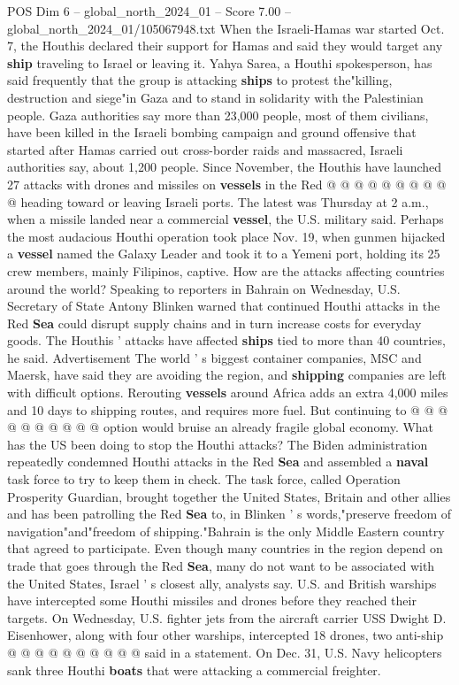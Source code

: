 \begin{textsample}{POS Dim 6 – global\_north\_2024\_01 – Score 7.00 – global\_north\_2024\_01/105067948.txt}
When the Israeli-Hamas war started Oct. 7, the Houthis declared their support for Hamas and said they would target any \textbf{ship} traveling to Israel or leaving it.
Yahya Sarea, a Houthi spokesperson, has said frequently that the group is attacking \textbf{ships} to protest the"killing, destruction and siege"in Gaza and to stand in solidarity with the Palestinian people.
Gaza authorities say more than 23,000 people, most of them civilians, have been killed in the Israeli bombing campaign and ground offensive that started after Hamas carried out cross-border raids and massacred, Israeli authorities say, about 1,200 people.
Since November, the Houthis have launched 27 attacks with drones and missiles on \textbf{vessels} in the Red @ @ @ @ @ @ @ @ @ @ heading toward or leaving Israeli ports.
The latest was Thursday at 2 a.m., when a missile landed near a commercial \textbf{vessel}, the U.S. military said.
Perhaps the most audacious Houthi operation took place Nov. 19, when gunmen hijacked a \textbf{vessel} named the Galaxy Leader and took it to a Yemeni port, holding its 25 crew members, mainly Filipinos, captive.
How are the attacks affecting countries around the world?
Speaking to reporters in Bahrain on Wednesday, U.S.
Secretary of State Antony Blinken warned that continued Houthi attacks in the Red \textbf{Sea} could disrupt supply chains and in turn increase costs for everyday goods.
The Houthis ' attacks have affected \textbf{ships} tied to more than 40 countries, he said.
Advertisement The world ' s biggest container companies, MSC and Maersk, have said they are avoiding the region, and \textbf{shipping} companies are left with difficult options.
Rerouting \textbf{vessels} around Africa adds an extra 4,000 miles and 10 days to shipping routes, and requires more fuel.
But continuing to @ @ @ @ @ @ @ @ @ @ option would bruise an already fragile global economy.
What has the US been doing to stop the Houthi attacks?
The Biden administration repeatedly condemned Houthi attacks in the Red \textbf{Sea} and assembled a \textbf{naval} task force to try to keep them in check.
The task force, called Operation Prosperity Guardian, brought together the United States, Britain and other allies and has been patrolling the Red \textbf{Sea} to, in Blinken ' s words,"preserve freedom of navigation"and"freedom of shipping."Bahrain is the only Middle Eastern country that agreed to participate.
Even though many countries in the region depend on trade that goes through the Red \textbf{Sea}, many do not want to be associated with the United States, Israel ' s closest ally, analysts say.
U.S. and British warships have intercepted some Houthi missiles and drones before they reached their targets.
On Wednesday, U.S. fighter jets from the aircraft carrier USS Dwight D.
Eisenhower, along with four other warships, intercepted 18 drones, two anti-ship @ @ @ @ @ @ @ @ @ @ said in a statement.
On Dec. 31, U.S.
Navy helicopters sank three Houthi \textbf{boats} that were attacking a commercial freighter.

\end{textsample}
